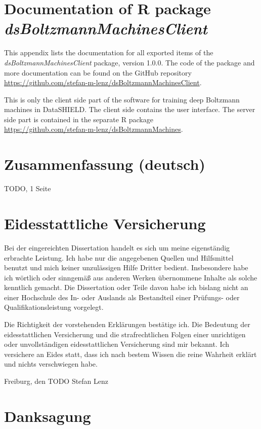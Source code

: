 \documentclass[12pt]{article}
\newcommand{\apkg}[1]{\emph{#1}}
\begin{document}
\begin{appendices}


\clearpage
\section[Documentation of R package \apkg{dsBoltzmannMachinesClient}]{Documentation of R package \\ \apkg{dsBoltzmannMachinesClient}}
This appendix lists the documentation for all exported items of the \apkg{dsBoltzmannMachinesClient} package, version 1.0.0. %
The code of the package and more documentation can be found on the GitHub repository\\ \url{https://github.com/stefan-m-lenz/dsBoltzmannMachinesClient}.

This is only the client side part of the software for training deep Boltzmann machines in DataSHIELD. The client side contains the user interface. The server side part is contained in the separate R package \\
\url{https://github.com/stefan-m-lenz/dsBoltzmannMachines}.



\clearpage
\section{Zusammenfassung (deutsch)}
TODO, 1 Seite

\clearpage
\section{Eidesstattliche Versicherung}
Bei der eingereichten Dissertation handelt es sich um meine eigenständig erbrachte Leistung.
Ich habe nur die angegebenen Quellen und Hilfsmittel benutzt und mich keiner unzulässigen Hilfe Dritter bedient. Insbesondere habe ich wörtlich oder sinngemäß aus anderen Werken übernommene Inhalte als solche kenntlich gemacht. 
Die Dissertation oder Teile davon habe ich bislang nicht an einer Hochschule des In- oder Auslands als Bestandteil einer Prüfungs- oder Qualifikationsleistung vorgelegt.

Die Richtigkeit der vorstehenden Erklärungen bestätige ich. Die Bedeutung der eidesstattlichen Versicherung und die strafrechtlichen Folgen einer unrichtigen oder unvollständigen eidesstattlichen Versicherung sind mir bekannt.
Ich versichere an Eides statt, dass ich nach bestem Wissen die reine Wahrheit erklärt und nichts verschwiegen habe.
\vspace{2cm}

Freiburg, den TODO \hspace{3cm} Stefan Lenz

\clearpage
\section{Danksagung}



\end{appendices}
\end{document}
